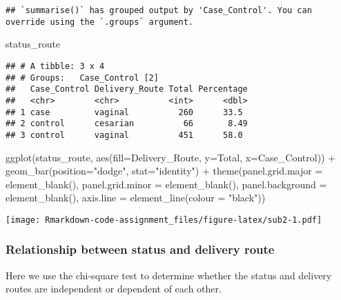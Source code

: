 \documentclass[
]{article}
\newenvironment{Shaded}{\begin{snugshade}}{\end{snugshade}}
\newcommand{\AttributeTok}[1]{\textcolor[rgb]{0.77,0.63,0.00}{#1}}
\newcommand{\FunctionTok}[1]{\textcolor[rgb]{0.00,0.00,0.00}{#1}}
\newcommand{\NormalTok}[1]{#1}
\newcommand{\SpecialCharTok}[1]{\textcolor[rgb]{0.00,0.00,0.00}{#1}}
\newcommand{\StringTok}[1]{\textcolor[rgb]{0.31,0.60,0.02}{#1}}
\begin{document}
\begin{verbatim}
## `summarise()` has grouped output by 'Case_Control'. You can override using the `.groups` argument.
\end{verbatim}

\begin{Shaded}
\begin{Highlighting}[]
\NormalTok{status\_route}
\end{Highlighting}
\end{Shaded}

\begin{verbatim}
## # A tibble: 3 x 4
## # Groups:   Case_Control [2]
##   Case_Control Delivery_Route Total Percentage
##   <chr>        <chr>          <int>      <dbl>
## 1 case         vaginal          260      33.5 
## 2 control      cesarian          66       8.49
## 3 control      vaginal          451      58.0
\end{verbatim}

\begin{Shaded}
\begin{Highlighting}[]
\FunctionTok{ggplot}\NormalTok{(status\_route, }\FunctionTok{aes}\NormalTok{(}\AttributeTok{fill=}\NormalTok{Delivery\_Route, }\AttributeTok{y=}\NormalTok{Total, }\AttributeTok{x=}\NormalTok{Case\_Control)) }\SpecialCharTok{+} 
  \FunctionTok{geom\_bar}\NormalTok{(}\AttributeTok{position=}\StringTok{"dodge"}\NormalTok{, }\AttributeTok{stat=}\StringTok{"identity"}\NormalTok{) }\SpecialCharTok{+} 
  \FunctionTok{theme}\NormalTok{(}\AttributeTok{panel.grid.major =} \FunctionTok{element\_blank}\NormalTok{(), }\AttributeTok{panel.grid.minor =} \FunctionTok{element\_blank}\NormalTok{(),}
        \AttributeTok{panel.background =} \FunctionTok{element\_blank}\NormalTok{(), }\AttributeTok{axis.line =} \FunctionTok{element\_line}\NormalTok{(}\AttributeTok{colour =} \StringTok{"black"}\NormalTok{))}
\end{Highlighting}
\end{Shaded}

\texttt{[image: Rmarkdown-code-assignment\_files/figure-latex/sub2-1.pdf]}

\hypertarget{relationship-between-status-and-delivery-route}{%
\subsubsection{Relationship between status and delivery
route}\label{relationship-between-status-and-delivery-route}}

Here we use the chi-square test to determine whether the status and
delivery routes are independent or dependent of each other.
\end{document}
